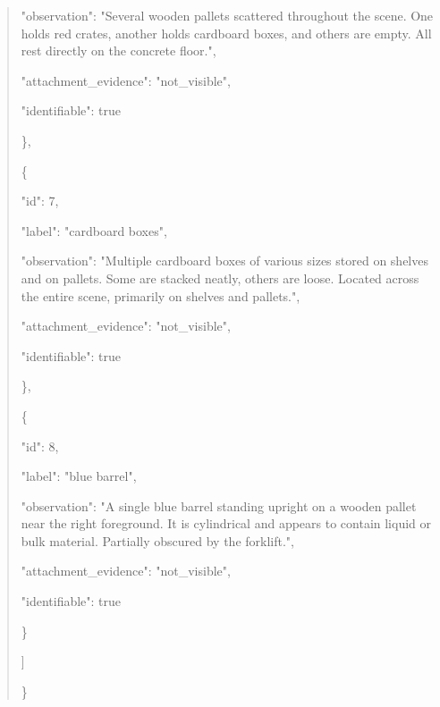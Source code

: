 \documentclass[10pt,a4paper]{article}
\begin{document}
\begin{quote}
      "observation":\allowbreak{} "Several wooden pallets scattered throughout the scene. One holds red crates,\allowbreak{} another holds cardboard boxes,\allowbreak{} and others are empty. All rest directly on the concrete floor.",\allowbreak{}\par
      "attachment\_evidence":\allowbreak{} "not\_visible",\allowbreak{}\par
      "identifiable":\allowbreak{} true\par
    \},\allowbreak{}\par
    \{\par
      "id":\allowbreak{} 7,\allowbreak{}\par
      "label":\allowbreak{} "cardboard boxes",\allowbreak{}\par
      "observation":\allowbreak{} "Multiple cardboard boxes of various sizes stored on shelves and on pallets. Some are stacked neatly,\allowbreak{} others are loose. Located across the entire scene,\allowbreak{} primarily on shelves and pallets.",\allowbreak{}\par
      "attachment\_evidence":\allowbreak{} "not\_visible",\allowbreak{}\par
      "identifiable":\allowbreak{} true\par
    \},\allowbreak{}\par
    \{\par
      "id":\allowbreak{} 8,\allowbreak{}\par
      "label":\allowbreak{} "blue barrel",\allowbreak{}\par
      "observation":\allowbreak{} "A single blue barrel standing upright on a wooden pallet near the right foreground. It is cylindrical and appears to contain liquid or bulk material. Partially obscured by the forklift.",\allowbreak{}\par
      "attachment\_evidence":\allowbreak{} "not\_visible",\allowbreak{}\par
      "identifiable":\allowbreak{} true\par
    \}\par
  ]\par
\}
\end{quote}
\end{document}
